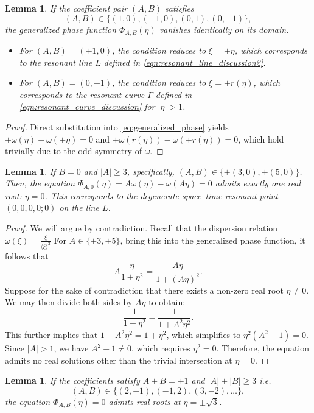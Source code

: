 \documentclass[reqno,english,11pt]{amsart}
\newcommand{\jxi}{\langle \xi \rangle}
\newtheorem{lemma}[theorem]{Lemma}
\theoremstyle{definition}
\numberwithin{equation}{section}
\begin{document}
\begin{lemma}\label{lem:resonance_manifold}
    If the coefficient pair $(A,B)$ satisfies
    $$(A,B) \in \{(1,0), (-1,0), (0,1), (0,-1)\},$$ the generalized phase function $\Phi_{A,B}(\eta)$ vanishes identically on its domain. 
    \begin{itemize}
        \item For $(A,B) = (\pm 1, 0)$, the condition reduces to $\xi = \pm \eta$, which corresponds to the resonant line $L$ defined in \eqref{eqn:resonant_line_discussion2}.
        \item For $(A,B) = (0, \pm 1)$, the condition reduces to $\xi = \pm r(\eta)$, which corresponds to the resonant curve $\Gamma$ defined in \eqref{eqn:resonant_curve_discussion} for $|\eta| > 1$.
    \end{itemize}
\end{lemma}
\begin{proof}
    Direct substitution into \eqref{eq:generalized_phase} yields $\pm \omega(\eta) - \omega(\pm \eta) = 0$ and $\pm \omega(r(\eta)) - \omega(\pm r(\eta)) = 0$, which hold trivially due to the odd symmetry of $\omega$.
\end{proof}
\begin{lemma}\label{lem:trivial_origin}
    If $B = 0$ and $|A| \ge 3$, specifically, $(A,B) \in \{\pm(3,0), \pm(5,0)\}$. Then, the equation $\Phi_{A,0}(\eta) = A\omega(\eta) - \omega(A\eta) = 0$ admits exactly one real root: $\eta = 0$. This corresponds to the degenerate space--time resonant point $(0,0,0,0;0)$ on the line $L$.
\end{lemma}
\begin{proof}
    We will argue by contradiction. Recall that the dispersion relation $\omega(\xi) = \frac{\xi}{\jxi^2}$ For $A \in \{\pm 3, \pm 5\}$, bring this into the generalized phase function, it follows that
    $$A\frac{\eta}{1+\eta^2}=\frac{A\eta}{1+(A\eta)^2}.$$
    Suppose for the sake of contradiction that there exists a non-zero real root $\eta \neq 0$. We may then divide both sides by $A\eta$ to obtain:
    \begin{equation}
        \frac{1}{1+\eta^2} = \frac{1}{1+A^2\eta^2}.
    \end{equation}
    This further implies that $1+A^2\eta^2 = 1+\eta^2$, which simplifies to $\eta^2(A^2-1) = 0$. Since $|A| > 1$, we have $A^2-1 \neq 0$, which requires $\eta^2 = 0$. Therefore, the equation admits no real solutions other than the trivial intersection at $\eta = 0$.
\end{proof}
\begin{lemma}\label{lem:sqrt3_res}
    If the coefficients satisfy $A + B = \pm 1$ and $|A| + |B| \ge 3$ i.e. $$(A,B) \in \{(2,-1), (-1,2), (3,-2), \dots\},$$ the equation $\Phi_{A,B}(\eta) = 0$ admits real roots at $\eta = \pm \sqrt{3}$.
\end{lemma}
\end{document}

